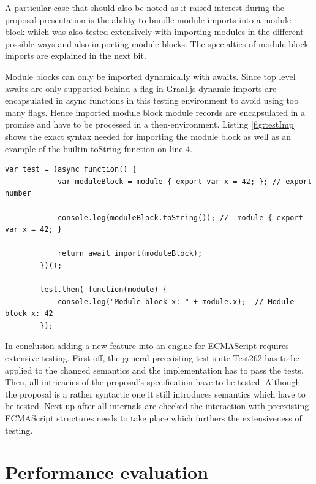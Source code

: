 A particular case that should also be noted as it raised interest during the proposal presentation is the ability to bundle module imports into a module block which was also tested extensively with importing modules in the different possible ways and also importing module blocks. The specialties of module block imports are explained in the next bit.

Module blocks can only be imported dynamically with awaits. Since top level awaits are only supported behind a flag in Graal.js dynamic imports are encapsulated in async functions in this testing environment to avoid using too many flags. Hence imported module block module records are encapsulated in a promise and have to be processed in a \linebreak then-environment. Listing \ref{fig:testImp} shows the exact syntax needed for importing the module block as well as an example of the builtin toString function on line 4.

    \begin{lstlisting}[caption={Module block dynamic import test}, label={fig:testImp}]
        var test = (async function() {
            var moduleBlock = module { export var x = 42; }; // export number
            
            console.log(moduleBlock.toString()); //  module { export var x = 42; }
            
            return await import(moduleBlock);
        })();
        
        test.then( function(module) {
            console.log("Module block x: " + module.x);  // Module block x: 42
        });
    \end{lstlisting}

In conclusion adding a new feature into an engine for ECMAScript requires extensive testing. First off, the general preexisting test suite Test262 has to be applied to the changed semantics and the implementation has to pass the tests. Then, all intricacies of the proposal's specification have to be tested. Although the proposal is a rather syntactic one it still introduces semantics which have to be tested. Next up after all internals are checked the interaction with preexisting ECMAScript structures needs to take place which furthers the extensiveness of testing.

\section{Performance evaluation}

